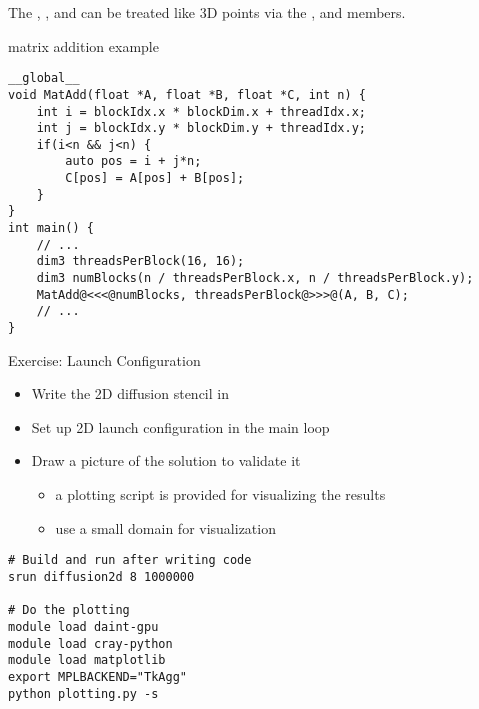 \documentclass[aspectratio=43]{beamer}
\begin{document}
\begin{frame}[fragile]{}

    The , ,  and  can be treated like 3D points via the ,  and  members.
    \begin{code}{matrix addition example}
        \begin{lstlisting}[style=boxcudatiny]
__global__
void MatAdd(float *A, float *B, float *C, int n) {
    int i = blockIdx.x * blockDim.x + threadIdx.x;
    int j = blockIdx.y * blockDim.y + threadIdx.y;
    if(i<n && j<n) {
        auto pos = i + j*n;
        C[pos] = A[pos] + B[pos];
    }
}
int main() {
    // ...
    dim3 threadsPerBlock(16, 16);
    dim3 numBlocks(n / threadsPerBlock.x, n / threadsPerBlock.y);
    MatAdd@<<<@numBlocks, threadsPerBlock@>>>@(A, B, C);
    // ...
}
        \end{lstlisting}
   \end{code}

\end{frame}

\begin{frame}[fragile]{Exercise: Launch Configuration}
    \begin{itemize}
        \item Write the 2D diffusion stencil in 
        \item Set up 2D launch configuration in the main loop
        \item Draw a picture of the solution to validate it
        \begin{itemize}
            \item a plotting script is provided for visualizing the results
            \item use a small domain for visualization
        \end{itemize}
    \end{itemize}

    \begin{terminal}{}
        \begin{lstlisting}[style=terminal]
# Build and run after writing code
srun diffusion2d 8 1000000

# Do the plotting
module load daint-gpu
module load cray-python
module load matplotlib
export MPLBACKEND="TkAgg"
python plotting.py -s
        \end{lstlisting}
    \end{terminal}
\end{frame}
\end{document}
